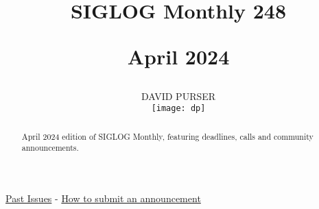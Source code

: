 \documentclass[prodmode,acmtecs]{acmsmall} %
\newcounter{colstart}
\begin{document}
\setcounter{colstart}{\thepage}

\title{{\huge\sc SIGLOG Monthly 248}

 April 2024}
\author{DAVID PURSER
\vspace*{-2.6cm}\begin{flushright}\texttt{[image: dp]}\end{flushright}
}

\begin{abstract}
April 2024 edition of SIGLOG Monthly, featuring deadlines, calls and community announcements.
\end{abstract}


\maketitlee

\href{https://lics.siglog.org/newsletters/}{Past Issues}
 - 
\href{https://lics.siglog.org/newsletters/inst.html}{How to submit an announcement}
\end{document}
